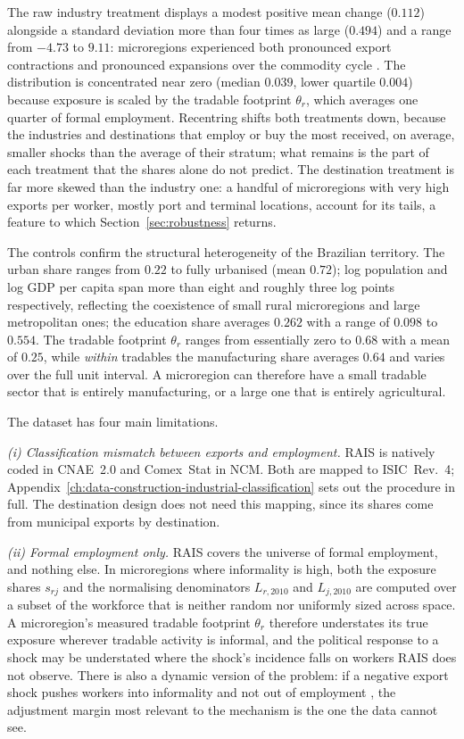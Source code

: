 \documentclass[
	11pt,				%
	oneside,			%
	a4paper,			%
	english,			%
	english				%
	]{abntex2ppgsi}
\theoremstyle{plain}
\theoremstyle{remark}
\theoremstyle{plain}%
\theoremstyle{remark}%
\begin{document}
The raw industry treatment displays a modest positive mean change ($0.112$) alongside a standard deviation more than four times as large ($0.494$) and a range from $-4.73$ to $9.11$: microregions experienced both pronounced export contractions and pronounced expansions over the commodity cycle \cite{cooney}. The distribution is concentrated near zero (median $0.039$, lower quartile $0.004$) because exposure is scaled by the tradable footprint $\theta_r$, which averages one quarter of formal employment. Recentring shifts both treatments down, because the industries and destinations that employ or buy the most received, on average, smaller shocks than the average of their stratum; what remains is the part of each treatment that the shares alone do not predict. The destination treatment is far more skewed than the industry one: a handful of microregions with very high exports per worker, mostly port and terminal locations, account for its tails, a feature to which Section~\ref{sec:robustness} returns.

The controls confirm the structural heterogeneity of the Brazilian territory. The urban share ranges from $0.22$ to fully urbanised (mean $0.72$); log population and log GDP per capita span more than eight and roughly three log points respectively, reflecting the coexistence of small rural microregions and large metropolitan ones; the education share averages $0.262$ with a range of $0.098$ to $0.554$. The tradable footprint $\theta_r$ ranges from essentially zero to $0.68$ with a mean of $0.25$, while \emph{within} tradables the manufacturing share averages $0.64$ and varies over the full unit interval. A microregion can therefore have a small tradable sector that is entirely manufacturing, or a large one that is entirely agricultural.

The dataset has four main limitations.

\textit{(i) Classification mismatch between exports and employment.} RAIS is natively coded in CNAE~2.0 and Comex~Stat in NCM. Both are mapped to ISIC~Rev.~4; Appendix~\ref{ch:data-construction-industrial-classification} sets out the procedure in full. The destination design does not need this mapping, since its shares come from municipal exports by destination.

\textit{(ii) Formal employment only.} RAIS covers the universe of formal employment, and nothing else. In microregions where informality is high, both the exposure shares $s_{rj}$ and the normalising denominators $L_{r,2010}$ and $L_{j,2010}$ are computed over a subset of the workforce that is neither random nor uniformly sized across space. A microregion's measured tradable footprint $\theta_r$ therefore understates its true exposure wherever tradable activity is informal, and the political response to a shock may be understated where the shock's incidence falls on workers RAIS does not observe. There is also a dynamic version of the problem: if a negative export shock pushes workers into informality and not out of employment \cite{paz2019,dix2025}, the adjustment margin most relevant to the mechanism is the one the data cannot see.
\end{document}
